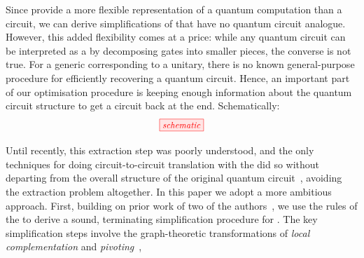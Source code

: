 \documentclass[a4paper,onecolumn,superscriptaddress,11pt,accepted=2020-04-27]{quantumarticle}
\theoremstyle{definition}
\begin{document}
Since \zxdiagrams provide a more flexible representation of a quantum computation than a circuit, we can derive simplifications of \zxdiagrams that have no quantum circuit analogue. 
However, this added flexibility comes at a price: while any quantum circuit can be interpreted as a \zxdiagram by decomposing gates into smaller pieces, the converse is not true. For a generic \zxdiagram corresponding to a unitary, there is no known general-purpose procedure for efficiently recovering a quantum circuit. Hence, an important part of our optimisation procedure is keeping enough information about the quantum circuit structure to get a circuit back at the end. Schematically:
\[ \scalebox{0.9}{\tikzfig{schematic}} \]

Until recently, this extraction step was poorly understood, and the only techniques for doing circuit-to-circuit translation with the \zxcalculus did so without departing from the overall structure of the original quantum circuit~\cite{FaganDuncan}, avoiding the extraction problem altogether. In this paper we adopt a more ambitious approach. First, building on prior work of two of the authors~\cite{DP1,DP2,DP3}, we use the rules of the \zxcalculus to derive a sound, terminating simplification procedure for \zxdiagrams. The key simplification steps involve the graph-theoretic transformations of \emph{local complementation} and \emph{pivoting}~\cite{kotzig,Bouchet87}, 
\end{document}
